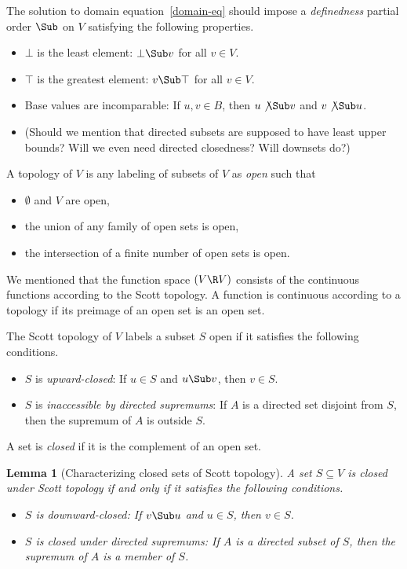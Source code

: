 \documentclass{amsart}
\newtheorem{lemma}[subsection]{Lemma}
\begin{document}
 The solution to domain
equation~\eqref{domain-eq} should impose a \emph{definedness}
partial order $\Sub$ on $V$ satisfying the following properties.
\begin{itemize}
\item $\bot$ is the least element: $\bot\Sub v$ for all $v\in V$.
\item $\top$ is the greatest element: $v\Sub\top$ for all $v\in
V$.
\item Base values are incomparable: If $u,v\in B$, then
$u\not\Sub v$ and $v\not\Sub u$.
\item (Should we mention that directed subsets are supposed to
have least upper bounds? Will we even need directed closedness?
Will downsets do?)
\end{itemize}
A topology of $V$ is any labeling of subsets of $V$ as
\emph{open} such that
\begin{itemize}
\item $\emptyset$ and $V$ are open,
\item the union of any family of open sets is open,
\item the intersection of a finite number of open sets is open.
\end{itemize}
We mentioned that the function space $(V\R V)$ consists of the
continuous functions according to the Scott topology. A function
is continuous according to a topology if its preimage of an open
set is an open set.

\begin{samepage}
The Scott topology of $V$ labels a subset $S$ open if it
satisfies the following conditions.
\begin{itemize}
\item $S$ is \emph{upward-closed}: If $u\in S$ and $u\Sub v$,
then $v\in S$.
\item $S$ is \emph{inaccessible by directed supremums}: If $A$ is
a directed set disjoint from $S$, then the supremum of $A$ is
outside $S$.
\end{itemize}
\end{samepage}

A set is \emph{closed} if it is the complement of an open set.

\begin{lemma}[Characterizing closed sets of Scott topology]
A set $S\subseteq V$ is closed under Scott topology if and
only if it satisfies the following conditions.
\begin{itemize}
\item $S$ is \emph{downward-closed}: If $v\Sub u$ and $u\in S$,
then $v\in S$.
\item $S$ is \emph{closed under directed supremums}: If
$A$ is a directed subset of $S$, then the supremum of $A$ is a
member of $S$.
\end{itemize}
\end{lemma}
\end{document}

